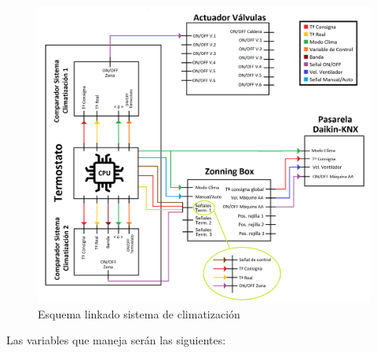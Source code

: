  \begin{center}
\begin{figure}[H]
\includegraphics[width=1.15\textwidth]{figures/prog_termost.png}   
\caption{Esquema linkado sistema de climatización}
\label{fig:prog_termost}
\end{figure}
\end{center}
Las variables que maneja serán las siguientes: 
